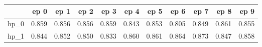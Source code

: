 \begin{tabular}{lrrrrrrrrrr}
\toprule
{} &   ep 0 &   ep 1 &   ep 2 &   ep 3 &   ep 4 &   ep 5 &   ep 6 &   ep 7 &   ep 8 &   ep 9 \\
\midrule
hp\_0 &  0.859 &  0.856 &  0.856 &  0.859 &  0.843 &  0.853 &  0.805 &  0.849 &  0.861 &  0.855 \\
hp\_1 &  0.844 &  0.852 &  0.850 &  0.833 &  0.860 &  0.861 &  0.864 &  0.873 &  0.847 &  0.858 \\
\bottomrule
\end{tabular}
